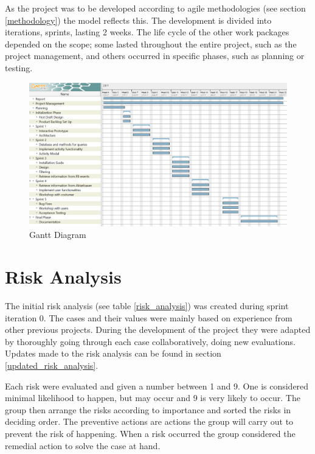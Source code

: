 As the project was to be developed according to agile methodologies (see section \ref{methodology}) the model reflects this. The development is divided into iterations, sprints, lasting 2 weeks. The life cycle of the other work packages depended on the scope; some lasted throughout the entire project, such as the project management, and others occurred in specific phases, such as planning or testing. 

\begin{figure}[ht]
\centering
    \includegraphics[width=\textwidth]{fig/GanttDiagram.PNG}
\caption{Gantt Diagram}
\label{Gantt_Diagram}
\end{figure}

\section{Risk Analysis} 
\label{riskAnalysis}
The initial risk analysis (see table \ref{risk_analysis}) was created during sprint iteration 0. The cases and their values were mainly based on experience from other previous projects. During the development of the project they were adapted by thoroughly going through each case collaboratively, doing new evaluations. Updates made to the risk analysis can be found in section \ref{updated_risk_analysis}. 

Each risk were evaluated and given a number between 1 and 9. One is considered minimal likelihood to happen, but may occur and 9 is very likely to occur. The group then arrange the risks according to importance and sorted the risks in deciding order. The preventive actions are actions the group will carry out to prevent the risk of happening. When a risk occurred the group considered the remedial action to solve the case at hand. 


